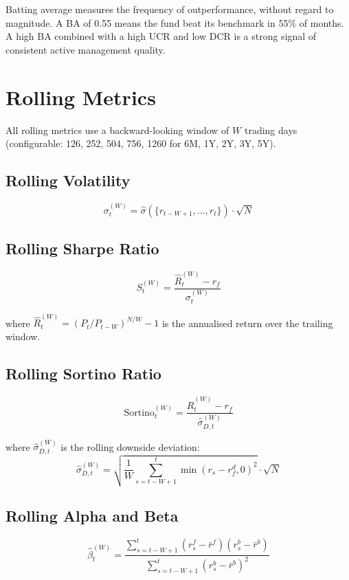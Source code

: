 \documentclass[12pt, a4paper]{article}
\newcommand{\rf}{r_f}
\begin{document}
Batting average measures the frequency of outperformance, without regard
to magnitude.  A BA of 0.55 means the fund beat its benchmark in 55\% of
months.  A high BA combined with a high UCR and low DCR is a strong
signal of consistent active management quality.

\section{Rolling Metrics}

All rolling metrics use a backward-looking window of $W$ trading days
(configurable: 126, 252, 504, 756, 1260 for 6M, 1Y, 2Y, 3Y, 5Y).

\subsection{Rolling Volatility}

\[
  \sigma_t^{(W)} = \hat{\sigma}\!\left(\{r_{t-W+1}, \ldots, r_t\}\right) \cdot \sqrt{N}
\]

\subsection{Rolling Sharpe Ratio}

\[
  S_t^{(W)} = \frac{\hat{R}_t^{(W)} - \rf}{\sigma_t^{(W)}}
\]

where $\hat{R}_t^{(W)} = (P_t/P_{t-W})^{N/W} - 1$ is the annualised
return over the trailing window.

\subsection{Rolling Sortino Ratio}

\[
  \text{Sortino}_t^{(W)} =
  \frac{\hat{R}_t^{(W)} - \rf}{\hat{\sigma}_{D,t}^{(W)}}
\]

where $\hat{\sigma}_{D,t}^{(W)}$ is the rolling downside deviation:
\[
  \hat{\sigma}_{D,t}^{(W)} = \sqrt{\frac{1}{W}\sum_{s=t-W+1}^{t}\min(r_s - r_f^d, 0)^2} \cdot \sqrt{N}
\]

\subsection{Rolling Alpha and Beta}

\[
  \hat{\beta}_t^{(W)} = \frac{\sum_{s=t-W+1}^{t}(r_s^f - \bar{r}^f)(r_s^b - \bar{r}^b)}
                          {\sum_{s=t-W+1}^{t}(r_s^b - \bar{r}^b)^2}
\]
\end{document}
